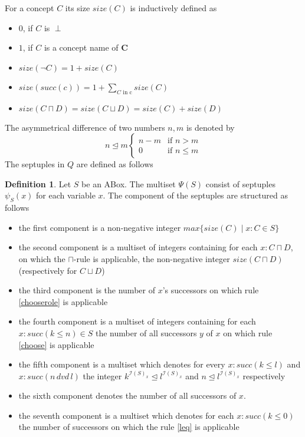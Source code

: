 \documentclass[a4paper,11pt]{scrartcl}
\theoremstyle{break}
\theoremstyle{definition}
\newtheorem{mydef}{Definition}
\begin{document}
For a concept $C$ its size $size(C)$ is inductively defined as
\begin{itemize}
\item $0$, if $C$ is $\perp$
\item $1$, if $C$ is a concept name of $\mathbf{C}$
\item $size(\neg C)= 1+size(C)$
\item $size(succ(c))= 1 + \sum_{C\text{ in c}} size(C)$
\item $size(C\sqcap D)=size(C\sqcup D)=size(C)+size(D)$
\end{itemize}
The asymmetrical difference of two numbers $n,m$ is denoted by 
\begin{equation*}
n\unlhd m \begin{cases}
n-m& \text{if } n> m\\
0 & \text{if } n\leq m
\end{cases}
\end{equation*}
The septuples in $Q$ are defined as follows
\begin{mydef}
Let $S$ be an ABox. The multiset $\Psi(S)$ consist of septuples $\psi_S(x)$ for each variable $x$. The component of the septuples are structured as follows
\begin{itemize}
\item the first component is a non-negative integer $max\{size(C)\mid x:C\in S\}$
\item the second component is a multiset of integers containing for each $x:C\sqcap D$, on which the $\sqcap$-rule is applicable, the non-negative integer $size(C\sqcap D)$ (respectively for $C\sqcup D$)
\item the third component is the number of $x$'s successors on which rule \ref{chooserole} is applicable
\item the fourth component is a multiset of integers containing for each $x:succ(k\leq n)\in S$ the number of all successors $y$ of $x$ on which rule \ref{choose} is applicable
\item the fifth component is a multiset which denotes for every $x:succ(k\leq l)$ and $x:succ(n\,dvd\,l)$ the integer $k^{\mathcal{I}(S)_x}\unlhd l^{\mathcal{I}(S)_x}$ and $n\unlhd l^{\mathcal{I}(S)_x}$ respectively
\item the sixth component denotes the number of all successors of $x$.
\item the seventh component is a multiset which denotes for each $x:succ(k\leq 0)$ the number of successors on which the rule \ref{leq} is applicable
\end{itemize}
\end{mydef}
\end{document}
